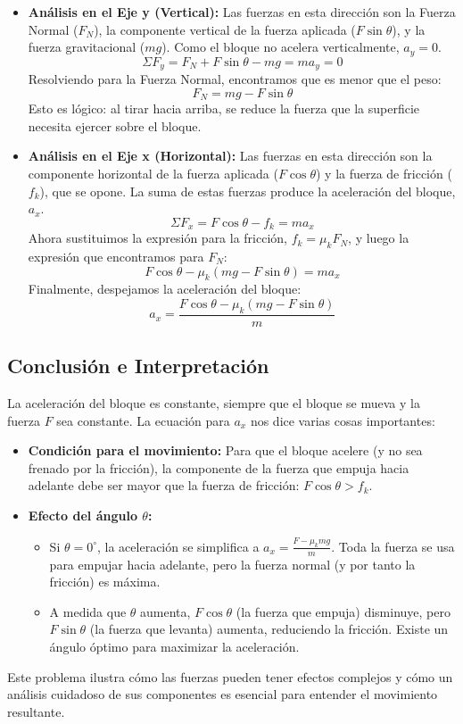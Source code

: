\documentclass[11pt,a4paper]{book}
\begin{document}
\begin{itemize}
    \item \textbf{Análisis en el Eje y (Vertical):}
    Las fuerzas en esta dirección son la Fuerza Normal ($F_N$), la componente vertical de la fuerza aplicada ($F\sin\theta$), y la fuerza gravitacional ($mg$). Como el bloque no acelera verticalmente, $a_y=0$.
    \[ \Sigma F_y = F_N + F \sin\theta - mg = m a_y = 0 \]
    Resolviendo para la Fuerza Normal, encontramos que es menor que el peso:
    \[ \boxed{F_N = mg - F \sin\theta} \]
    Esto es lógico: al tirar hacia arriba, se reduce la fuerza que la superficie necesita ejercer sobre el bloque.

    \item \textbf{Análisis en el Eje x (Horizontal):}
    Las fuerzas en esta dirección son la componente horizontal de la fuerza aplicada ($F\cos\theta$) y la fuerza de fricción ($f_k$), que se opone. La suma de estas fuerzas produce la aceleración del bloque, $a_x$.
    \[ \Sigma F_x = F \cos\theta - f_k = m a_x \]
    Ahora sustituimos la expresión para la fricción, $f_k = \mu_k F_N$, y luego la expresión que encontramos para $F_N$:
    \[ F \cos\theta - \mu_k (mg - F \sin\theta) = m a_x \]
    Finalmente, despejamos la aceleración del bloque:
    \[ \boxed{ a_x = \frac{F \cos\theta - \mu_k (mg - F \sin\theta)}{m} } \]
\end{itemize}

\subsection*{Conclusión e Interpretación}

La aceleración del bloque es constante, siempre que el bloque se mueva y la fuerza $F$ sea constante. La ecuación para $a_x$ nos dice varias cosas importantes:
\begin{itemize}
    \item \textbf{Condición para el movimiento:} Para que el bloque acelere (y no sea frenado por la fricción), la componente de la fuerza que empuja hacia adelante debe ser mayor que la fuerza de fricción: $F \cos\theta > f_k$.
    \item \textbf{Efecto del ángulo $\theta$:}
        \begin{itemize}
            \item Si $\theta = 0^\circ$, la aceleración se simplifica a $a_x = \frac{F - \mu_k mg}{m}$. Toda la fuerza se usa para empujar hacia adelante, pero la fuerza normal (y por tanto la fricción) es máxima.
            \item A medida que $\theta$ aumenta, $F\cos\theta$ (la fuerza que empuja) disminuye, pero $F\sin\theta$ (la fuerza que levanta) aumenta, reduciendo la fricción. Existe un ángulo óptimo para maximizar la aceleración.
        \end{itemize}
\end{itemize}
Este problema ilustra cómo las fuerzas pueden tener efectos complejos y cómo un análisis cuidadoso de sus componentes es esencial para entender el movimiento resultante.
\end{document}
